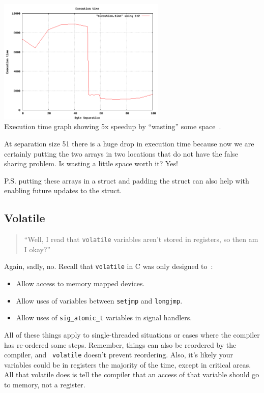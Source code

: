 \documentclass[a4paper]{report}
\begin{document}
\begin{center}
\includegraphics[width=0.6\textwidth]{images/falsesharing.png}\\
Execution time graph showing 5x speedup by ``wasting'' some space~\cite{falsesharing}.
\end{center}

At separation size 51 there is a huge drop in execution time because now we are certainly putting the two arrays in two locations that do not have the false sharing problem. Is wasting a little space worth it? Yes!

P.S. putting these arrays in a struct and padding the struct can also help with enabling future updates to the struct.

\subsection*{Volatile}

\begin{quote}
``Well, I read that {\tt volatile} variables aren't stored in registers,
    so then am I okay?''
\end{quote}

Again, sadly, no. Recall that {\tt volatile} in C was only designed to~\cite{pr:volatile}:
      \begin{itemize}
        \item Allow access to memory mapped devices.
        \item Allow uses of variables between {\tt setjmp} and {\tt longjmp}.
        \item Allow uses of {\tt sig\_atomic\_t} variables in signal handlers.
      \end{itemize}

All of these things apply to single-threaded situations or cases where the compiler has re-ordered some steps. Remember, things can also be reordered by the compiler, and {\tt
  volatile} doesn't prevent reordering. Also, it's likely your
variables could be in registers the majority of the time, except in
critical areas. All that volatile does is tell the compiler that an access of that variable should go to memory, not a register.
\end{document}
